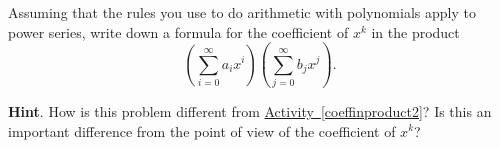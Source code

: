 \documentclass{book}
\begin{document}
\setcounter{cpjt}{248}
\addtocounter{cpjt}{-1}
\begin{activity}\label{coeffinpowerseries}
\hypertarget{p-1293}{}%
Assuming that the rules you use to do arithmetic with polynomials apply to power series, write down a formula for the coefficient of \(x^k\) in the product%
\begin{equation*}
\left(\sum_{i=0}^\infty a_ix^i\right)\left(\sum_{j=0}^\infty
b_jx^j\right)\text{.}
\end{equation*}
%
\par\smallskip%
\noindent\textbf{Hint}.\hypertarget{hint-157}{}\quad%
\hypertarget{p-1294}{}%
How is this problem different from \hyperref[coeffinproduct2]{Activity~\ref{coeffinproduct2}}? Is this an important difference from the point of view of the coefficient of \(x^k\)?%
\par\smallskip%
\noindent\end{activity}

\clearpage
\end{document}
